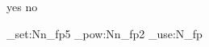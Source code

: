 \documentclass{tufte-book}
\begin{document}
\let\xp=\expandafter
\let\xp\undefined

\ifdefined \xp yes \else no \fi

\let\SyntaxOn\ExplSyntaxOn

\SyntaxOn
\fp_set:Nn\a_fp{5}
\fp_pow:Nn\a_fp{2}
\fp_use:N\a_fp\par

\ExplSyntaxOff
\end{document}
